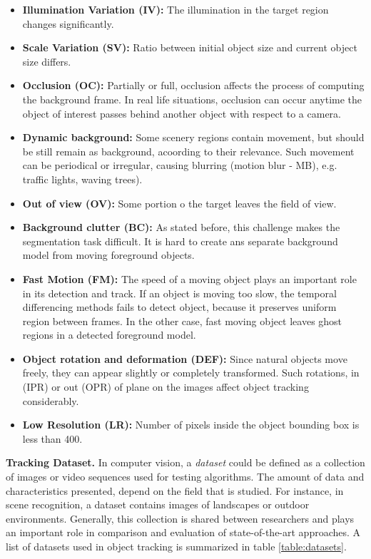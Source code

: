 \begin{itemize}
\item \textbf{Illumination Variation (IV):} The illumination in the target region
changes significantly.
\item \textbf{Scale Variation (SV):} Ratio between initial object size and
current object size differs.
\item \textbf{Occlusion (OC):} Partially or full, occlusion affects the process
of computing the background frame. In real life situations, occlusion can occur
anytime the object of interest passes behind another object with respect to a
camera.
\item \textbf{Dynamic background:} Some scenery regions contain movement, but
should be still remain as background, acoording to their relevance. Such
movement can be periodical or irregular, causing blurring (motion blur - MB),
e.g. traffic lights, waving trees).
\item \textbf{Out of view (OV): } Some portion o the target leaves the field
of view.
\item \textbf{Background clutter (BC):} As stated before, this challenge makes
the segmentation task difficult. It is hard to create ans separate background
model from moving foreground objects.
\item \textbf{Fast Motion (FM):} The speed of a moving object plays an
important role in its detection and track. If an object is moving too slow,
the temporal differencing methods fails to detect object, because it preserves
uniform region between frames. In the other case, fast moving object leaves
ghost regions in a detected foreground model.
\item \textbf{Object rotation and deformation (DEF):} Since natural objects
move freely, they can appear slightly or completely transformed. Such
rotations, in (IPR) or out (OPR) of plane on the images affect object tracking
considerably.
\item \textbf{Low Resolution (LR):} Number of pixels inside the object
bounding box is less than 400.
\end{itemize}

\textbf{Tracking Dataset. } In computer vision, a \textit{dataset} could be
defined as a collection of
images or video sequences used for testing algorithms. The amount of data and
characteristics presented, depend on the field that is studied.
For instance, in scene recognition, a dataset contains images of landscapes or
outdoor environments. Generally, this collection is shared between researchers
and plays an important role in comparison and evaluation of state-of-the-art
approaches. A list of datasets used in object tracking is summarized in table
\ref{table:datasets}.

